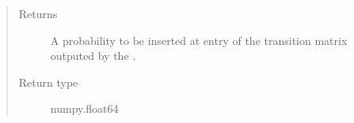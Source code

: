 \documentclass[letterpaper,10pt,english]{sphinxmanual}
\begin{document}
\begin{fulllineitems}
\begin{quote}
\begin{description}
\begin{itemize}
\end{itemize}

\item[{Returns}] \leavevmode
A probability to be inserted at entry  of the transition
matrix outputed by the {\hyperref[\detokenize{app.domain.helpers:app.domain.helpers.matrices._metropolis_hastings}]{}}.

\item[{Return type}] \leavevmode
numpy.float64

\end{description}\end{quote}

\end{fulllineitems}

\end{document}
